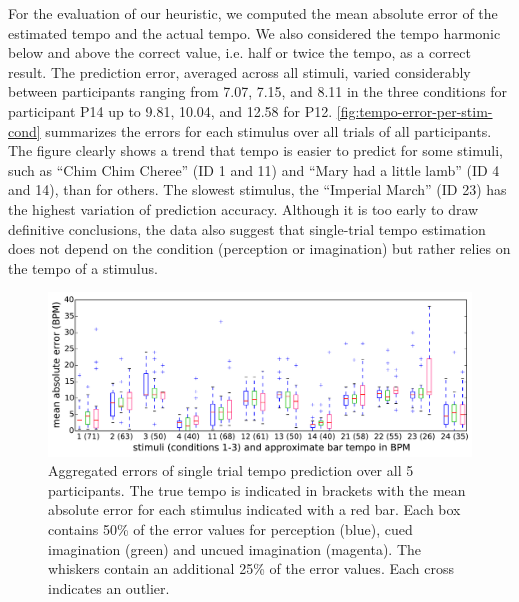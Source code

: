 For the evaluation of our heuristic, we computed the mean absolute error of the estimated tempo and the actual tempo.
We also considered the tempo harmonic below and above the correct value, i.e. half or twice the tempo, as a correct result.
The prediction error, averaged across all stimuli, varied considerably between participants ranging from 7.07, 7.15, and 8.11 in the three conditions for participant P14 up to 9.81, 10.04, and 12.58 for P12.
\autoref{fig:tempo-error-per-stim-cond} summarizes the errors for each stimulus over all trials of all participants.
The figure clearly shows a trend that tempo is easier to predict for some stimuli, such as ``Chim Chim Cheree'' (ID 1 and 11) and ``Mary had a little lamb'' (ID 4 and 14), than for others.
The slowest stimulus, the ``Imperial March'' (ID 23) has the highest variation of prediction accuracy.
Although it is too early to draw definitive conclusions, the data also suggest that single-trial tempo estimation does not depend on the condition (perception or imagination) but rather relies on the tempo of a stimulus.

\begin{figure}
  \begin{center}

\includegraphics[width=\textwidth,keepaspectratio=true]{Figures/tempo-error-per-stim-cond-all_colour.pdf}
    \caption{Aggregated errors of single trial tempo prediction over all 5 participants. The true tempo is indicated in brackets with the mean absolute error for each stimulus indicated with a red bar. Each box contains 50\% of the error values for perception (blue), cued imagination (green) and uncued imagination (magenta). The whiskers contain an additional 25\% of the error values. Each cross indicates an outlier. }
    \label{fig:tempo-error-per-stim-cond}
  \end{center}
\end{figure}
